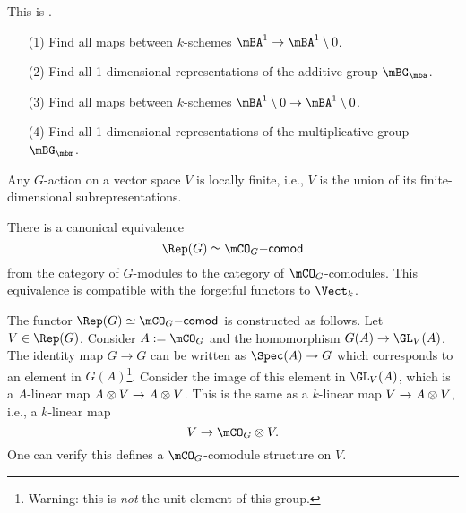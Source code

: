 \begin{exe}
	This is .
	\begin{itemize}
		\item[(1)]
			Find all maps between $k$-schemes $\mBA^1\to \mBA^1\setminus 0$.
		\item[(2)]
			Find all 1-dimensional representations of the additive group $\mBG_\mba$.
		\item[(3)]
			Find all maps between $k$-schemes $\mBA^1\setminus 0\to \mBA^1\setminus 0$.
		\item[(4)]
			Find all 1-dimensional representations of the multiplicative group $\mBG_\mbm$.
	\end{itemize}

\end{exe}

\begin{prop}
	Any $G$-action on a vector space $V$ is locally finite, i.e., $V$ is the union of its finite-dimensional subrepresentations.
\end{prop}


\begin{prop}
	There is a canonical equivalence
	\[
		\Rep(G) \simeq \mCO_G\mathsf{-comod}
	\]
	from the category of $G$-modules to the category of $\mCO_G$-comodules. This equivalence is compatible with the forgetful functors to $\Vect_k$.
\end{prop}

\begin{rem}
	The functor $\Rep(G) \simeq \mCO_G\mathsf{-comod}$ is constructed as follows. Let $V\in \Rep(G)$. Consider $A:=\mCO_G$ and the homomorphism $G(A) \to \GL_V(A)$. The identity map $G\to G$ can be written as $\Spec(A) \to G$ which corresponds to an element in $G(A)$\footnote{Warning: this is \emph{not} the unit element of this group.}. Consider the image of this element in $\GL_V(A)$, which is a $A$-linear map $A\ot V\to A\ot V$. This is the same as a $k$-linear map $V\to A\ot V$, i.e., a $k$-linear map
	\[
		V\to \mCO_G \ot V.
	\]
	One can verify this defines a $\mCO_G$-comodule structure on $V$.
\end{rem}

